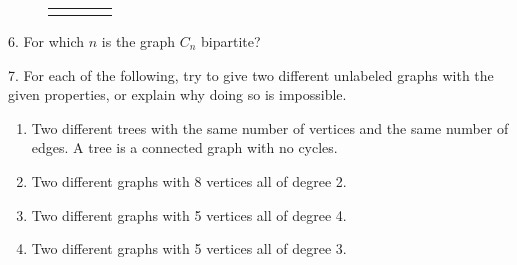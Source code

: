 \documentclass[10pt,]{book}
\theoremstyle{plain}
\theoremstyle{definition}
\theoremstyle{definition}
\theoremstyle{definition}
\numberwithin{equation}{chapter}
\newlength{\panelmax}
\begin{document}
\begin{exerciselist}
{\begin{figure}
\begin{tabular}{@{}*{4}{c}@{}}
\begin{minipage}[c][\panelmax][t]{0.25\textwidth}\usebox{\panelboxCAimage}\end{minipage}&
\begin{minipage}[c][\panelmax][t]{0.25\textwidth}\usebox{\panelboxCBimage}\end{minipage}&
\begin{minipage}[c][\panelmax][t]{0.25\textwidth}\usebox{\panelboxCCimage}\end{minipage}&
\begin{minipage}[c][\panelmax][t]{0.25\textwidth}\usebox{\panelboxCDimage}\end{minipage}\end{tabular}
\end{figure}
}%
\par\smallskip
\item[6.]\hypertarget{exercise-270}{}
For which \(n\) is the graph \(C_n\) bipartite?
%
\par\smallskip
\item[7.]\hypertarget{exercise-271}{}
For each of the following, try to give two different unlabeled graphs with the given properties, or explain why doing so is impossible.
%
\leavevmode%
\begin{enumerate}[label=(\alph*)]
\item\hypertarget{li-1202}{}
Two different trees with the same number of vertices and the same number of edges.  A tree is a connected graph with no cycles.
%
\item\hypertarget{li-1203}{}
Two different graphs with 8 vertices all of degree 2.
%
\item\hypertarget{li-1204}{}
Two different graphs with 5 vertices all of degree 4.
%
\item\hypertarget{li-1205}{}
Two different graphs with 5 vertices all of degree 3.
%
\end{enumerate}
\par\smallskip
\end{exerciselist}
\typeout{************************************************}
\typeout{************************************************}
\end{document}
